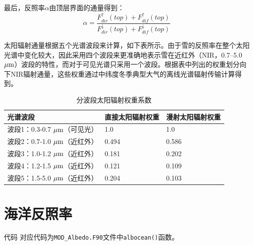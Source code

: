 最后，反照率\(\alpha\)由顶层界面的通量得到：
\begin{equation}
\alpha = \frac{F_{dir}^{\uparrow}(top) + F_{dif}^{\uparrow}(top)}{F_{dir}^{\downarrow}(top) + F_{dif}^{\downarrow}(top)}
\end{equation}

太阳辐射通量根据五个光谱波段来计算，如下表所示。由于雪的反照率在整个太阳光谱中变化较大，因此采用四个波段来更准确地表示雪在近红外（NIR，0.7--5.0 $\mu \rm{m}$）波段的特性，而对于可见光谱只采用一个波段。根据表中列出的权重划分向下NIR辐射通量，这些权重通过中纬度冬季典型大气的离线光谱辐射传输计算得到\citep{briegleb2007delta}。

\begin{table}[htbp]
\centering
\caption{分波段太阳辐射权重系数}
\label{tab:太阳辐射权重系数}
\begin{tabular}{lll}
\toprule
光谱波段 & 直接太阳辐射权重 & 漫射太阳辐射权重 \\ \midrule
波段1：0.3-0.7 $\mu \rm{m}$（可见光） & 1.0 & 1.0 \\
波段2：0.7-1.0 $\mu \rm{m}$（近红外） & 0.494 & 0.586 \\
波段3：1.0-1.2 $\mu \rm{m}$（近红外） & 0.181 & 0.202 \\
波段4：1.2-1.5 $\mu \rm{m}$（近红外） & 0.121 & 0.109 \\
波段5：1.5-5.0 $\mu \rm{m}$（近红外） & 0.204 & 0.103 \\ \bottomrule
\end{tabular}
\end{table}

\section{海洋反照率}\label{海洋反照率}
\begin{mymdframed}{代码}
对应代码为\texttt{MOD\_Albedo.F90}文件中\texttt{albocean()}函数。
\end{mymdframed}

